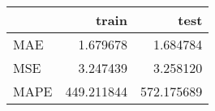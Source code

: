 \begin{tabular}{lrr}
\toprule
{} &       train &        test \\
\midrule
MAE  &    1.679678 &    1.684784 \\
MSE  &    3.247439 &    3.258120 \\
MAPE &  449.211844 &  572.175689 \\
\bottomrule
\end{tabular}
